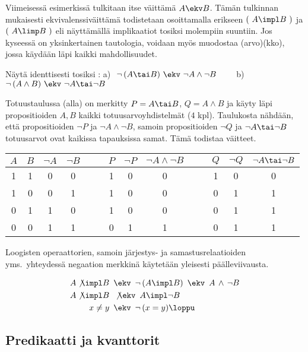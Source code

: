 Viimeisessä esimerkissä tulkitaan itse väittämä $A \ekv B$. Tämän tulkinnan mukaisesti 
ekvivalenssiväittämä todistetaan osoittamalla erikseen \fbox{\impl} $(\ A \impl B\ )$ ja
\fbox{\limp} $(\ A \limp B\ )$ eli näyttämällä implikaatiot tosiksi molempiin suuntiin.
Jos kyseessä on yksinkertainen tautologia, voidaan myös muodostaa
%
(arvo)(kko), jossa käydään läpi kaikki mahdollisuudet.
\begin{Exa} \label{de Morgan logiikassa} Näytä identtisesti tosiksi
: \vspace{1mm}\newline
a)\,\ $\neg\,(A \tai B)\ \ekv\ \neg A \wedge \neg B \qquad$
b)\,\ $\neg\,(A \wedge B)\ \ekv\ \neg A \tai \neg B$
\end{Exa}
\ratk Totuustaulussa (alla) on merkitty $P = A \tai B$, $Q = A \wedge B$ ja käyty läpi
propositioiden $A,B$ kaikki totuusarvoyhdistelmät  ($4$ kpl). Taulukosta nähdään, että
propositioiden $\neg P$ ja $\neg A \wedge \neg B$, samoin propositioiden $\neg Q$ ja 
\mbox{$\neg A \tai \neg B$} totuusarvot ovat kaikissa tapauksissa samat. Tämä todistaa
väitteet. \loppu

\begin{tabular}{cccccccccccccc}
$A$ & $B$ & $\neg A$ & $\neg B$ &  &  & $P$ & $\neg P$ & $\neg A \wedge \neg B$ & & & 
$Q$ & $\neg Q$ & $\neg A \tai \neg B$ \\ \hline
1 & 1 & 0 & 0 & & & 1 & 0 & 0 & & & 1 & 0 & 0 \\
1 & 0 & 0 & 1 & & & 1 & 0 & 0 & & & 0 & 1 & 1 \\
0 & 1 & 1 & 0 & & & 1 & 0 & 0 & & & 0 & 1 & 1 \\
0 & 0 & 1 & 1 & & & 0 & 1 & 1 & & & 0 & 1 & 1
\end{tabular}

Loogisten operaattorien, samoin järjestys- ja samastusrelaatioiden yms.\ yhteydessä negaation 
merkkinä käytetään yleisesti päälleviivausta.
\begin{Exa}
\begin{align*}
A \not\impl B \,\ &\ekv \,\ \neg\,( A \impl B ) \,\ \ekv \,\ A\,\wedge\,\neg B \\
A \not\impl B \,\ &\not\ekv \,\ A \impl \neg B \\
x \neq y \,\      &\ekv \,\ \neg\,(x=y) \loppu
\end{align*}
\end{Exa}

\subsection{Predikaatti ja kvanttorit}


